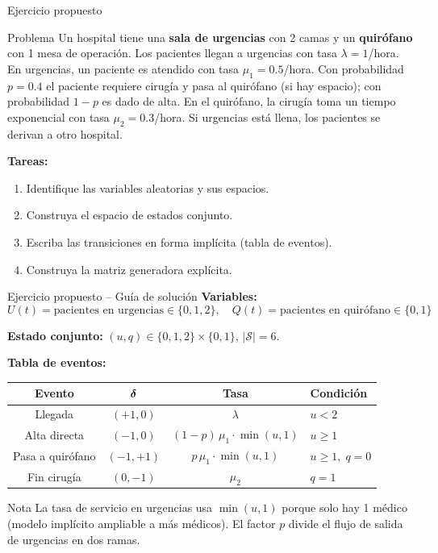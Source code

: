 \documentclass[aspectratio=1610, 9pt]{beamer}
\begin{document}
\begin{frame}{Ejercicio propuesto}
\begin{exampleblock}{Problema}
Un hospital tiene una \textbf{sala de urgencias} con 2 camas y un \textbf{quir\'ofano} con 1 mesa de operaci\'on. Los pacientes llegan a urgencias con tasa $\lambda = 1$/hora. En urgencias, un paciente es atendido con tasa $\mu_1 = 0.5$/hora. Con probabilidad $p = 0.4$ el paciente requiere cirug\'ia y pasa al quir\'ofano (si hay espacio); con probabilidad $1-p$ es dado de alta. En el quir\'ofano, la cirug\'ia toma un tiempo exponencial con tasa $\mu_2 = 0.3$/hora. Si urgencias est\'a llena, los pacientes se derivan a otro hospital.
\end{exampleblock}

\vspace{4pt}
\textbf{Tareas:}
\begin{enumerate}
    \item Identifique las variables aleatorias y sus espacios.
    \item Construya el espacio de estados conjunto.
    \item Escriba las transiciones en forma impl\'icita (tabla de eventos).
    \item Construya la matriz generadora expl\'icita.
\end{enumerate}
\end{frame}

\begin{frame}{Ejercicio propuesto -- Gu\'ia de soluci\'on}
\textbf{Variables:}
\[
U(t) = \text{pacientes en urgencias} \in \{0,1,2\}, \quad
Q(t) = \text{pacientes en quir\'ofano} \in \{0,1\}
\]

\textbf{Estado conjunto:} $(u, q) \in \{0,1,2\}\times\{0,1\}$, \; $|\mathcal{S}|=6$.

\vspace{4pt}
\textbf{Tabla de eventos:}

\footnotesize
\renewcommand{\arraystretch}{1.2}
\begin{tabular}{cccl}
\toprule
\textbf{Evento} & $\boldsymbol{\delta}$ & \textbf{Tasa} & \textbf{Condici\'on} \\
\midrule
Llegada & $(+1,0)$ & $\lambda$ & $u < 2$ \\
Alta directa & $(-1,0)$ & $(1{-}p)\,\mu_1\cdot\min(u,1)$ & $u \ge 1$ \\
Pasa a quir\'ofano & $(-1,+1)$ & $p\,\mu_1\cdot\min(u,1)$ & $u \ge 1,\; q = 0$ \\
Fin cirug\'ia & $(0,-1)$ & $\mu_2$ & $q = 1$ \\
\bottomrule
\end{tabular}

\normalsize
\vspace{6pt}
\begin{alertblock}{Nota}
La tasa de servicio en urgencias usa $\min(u,1)$ porque solo hay 1 m\'edico (modelo impl\'icito ampliable a m\'as m\'edicos). El factor $p$ divide el flujo de salida de urgencias en dos ramas.
\end{alertblock}
\end{frame}
\end{document}
